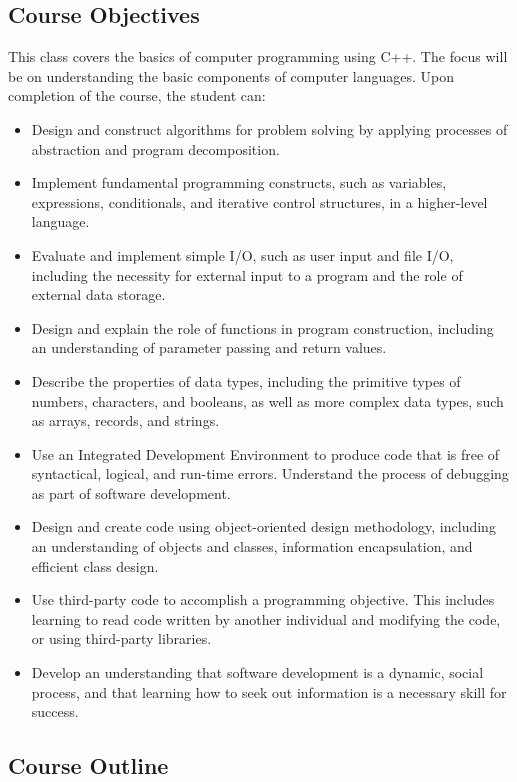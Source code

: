 \subsection{Course Objectives}
This class covers the basics of computer programming using C++. The focus will be on understanding the basic components of computer languages. Upon completion of the course, the student can:
\begin{itemize}
    \item  Design and construct algorithms for problem solving by applying processes of abstraction and program decomposition.
    \item Implement fundamental programming constructs, such as variables, expressions, conditionals, and iterative control structures, in a higher-level language.
    \item Evaluate and implement simple I/O, such as user input and file I/O, including the necessity for external input to a program and the role of external data storage.
    \item Design and explain the role of functions in program construction, including an understanding of parameter passing and return values.
    \item Describe the properties of data types, including the primitive types of numbers, characters, and booleans, as well as more complex data types, such as arrays, records, and strings.
    \item Use an Integrated Development Environment to produce code that is free of syntactical, logical, and run-time errors. Understand the process of debugging as part of software development.
    \item Design and create code using object-oriented design methodology, including an understanding of objects and classes, information encapsulation, and efficient class design.
    \item Use third-party code to accomplish a programming objective. This includes learning to read code written by another individual and modifying the code, or using third-party libraries.
    \item Develop an understanding that software development is a dynamic, social process, and that learning how to seek out information is a necessary skill for success.
\end{itemize}

\subsection{Course Outline}

